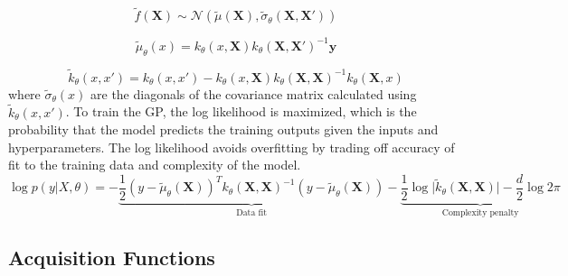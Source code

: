\begin{equation}
     \tilde f(\mathbf X) \sim \mathcal N(\tilde \mu(\mathbf X), \tilde \sigma_{\theta}(\mathbf X, \mathbf X'))
\end{equation}

\begin{equation}
    \tilde \mu_{\theta}(x) = k_{\theta}(x, \mathbf X)k_{\theta}(\mathbf X, \mathbf X')^{-1} \mathbf y
\end{equation}

\begin{equation}
    \tilde k_{\theta}(x,x') = k_{\theta}( x, x')-k_{\theta}(x, \mathbf X) k_{\theta}(\mathbf X, \mathbf X)^{-1}k_{\theta}(\mathbf X, x)
\end{equation}
where $\tilde \sigma_{\theta}(x)$ are the diagonals of the covariance matrix calculated using $\tilde k_{\theta}(x, x')$.
To train the GP, the log likelihood is maximized, which is the probability that the model predicts the training outputs given the inputs and hyperparameters. The log likelihood avoids overfitting by trading off accuracy of fit to the training data and complexity of the model.
\begin{equation}
    \log p(y \vert X, \theta) = -\underbrace{\frac{1}{2}(y-\tilde \mu_{\theta}(\mathbf X))^T k_{\theta}(\mathbf X, \mathbf X)^{-1}(y- \tilde\mu_{\theta}(\mathbf X)) }_{\text{Data  fit}}- \underbrace{\frac{1}{2} \log{\vert \tilde k_{\theta}(\mathbf X, \mathbf X) \vert} - \frac{d}{2}\log{2 \pi}}_{\text{Complexity penalty}}
\end{equation}

\subsection{Acquisition Functions}

